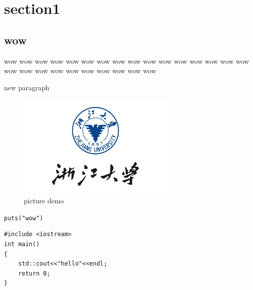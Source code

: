 \newpage
\section{section1}
\subsection{wow}
wow wow wow wow wow wow wow wow wow wow wow wow wow wow wow wow wow wow wow
wow wow wow wow wow wow wow
\par
new paragraph
\\
\begin{figure}[h] %
    \centering
    \includegraphics[width=8cm]{title/logo.png} %
    \caption{picture demo}           %
\end{figure}

\verb|puts("wow")| %

\par
\lstset{language=C++}
\begin{lstlisting}[caption = code demo]
#include <iostream>
int main()
{
    std::cout<<"hello"<<endl;
    return 0;
}
\end{lstlisting}